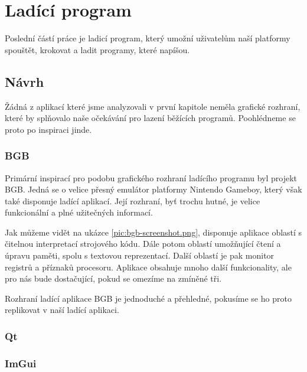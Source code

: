 \chapter{Ladící program}
\label{chap:debugger}

Poslední částí práce je ladicí program, který umožní uživatelům naší platformy spouštět, krokovat a ladit programy, které napíšou.

\section{Návrh}

Žádná z aplikací které jsme analyzovali v první kapitole neměla grafické rozhraní, které by splňovalo naše očekávání pro lazení běžících programů. Poohlédneme se proto po inspiraci jinde.

\subsection{BGB}

Primární inspirací pro podobu grafického rozhraní ladícího programu byl projekt BGB. Jedná se o velice přesný emulátor platformy Nintendo Gameboy, který však také disponuje ladící aplikací. Její rozhraní, byť trochu hutné, je velice funkcionální a plné užitečných informací.


Jak můžeme vidět na ukázce \ref{pic:bgb-screenshot.png}, disponuje aplikace oblastí s čitelnou interpretací strojového kódu. Dále potom oblastí umožňující čtení a úpravu paměti, spolu s textovou reprezentací. Další oblastí je pak monitor registrů a příznaků procesoru. Aplikace obsahuje mnoho další funkcionality, ale pro nás bude dostačující, pokud se omezíme na zmíněné tři.

Rozhraní ladící aplikace BGB je jednoduché a přehledné, pokusíme se ho proto replikovat v naší ladící aplikaci.

\subsection{Qt}

\blind[2]


\subsection{ImGui}


